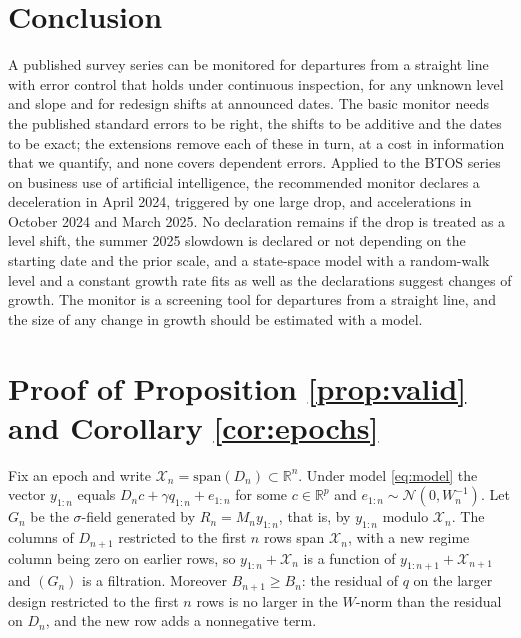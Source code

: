 \documentclass[Afour,sageh,times]{sagej}
\theoremstyle{definition}
\begin{document}
\section{Conclusion}
\label{sec:conclusion}

A published survey series can be monitored for departures from a straight line with error control that holds under continuous inspection, for any unknown level and slope and for redesign shifts at announced dates. The basic monitor needs the published standard errors to be right, the shifts to be additive and the dates to be exact; the extensions remove each of these in turn, at a cost in information that we quantify, and none covers dependent errors. Applied to the BTOS series on business use of artificial intelligence, the recommended monitor declares a deceleration in April 2024, triggered by one large drop, and accelerations in October 2024 and March 2025. No declaration remains if the drop is treated as a level shift, the summer 2025 slowdown is declared or not depending on the starting date and the prior scale, and a state-space model with a random-walk level and a constant growth rate fits as well as the declarations suggest changes of growth. The monitor is a screening tool for departures from a straight line, and the size of any change in growth should be estimated with a model.

\appendix

\section{Proof of Proposition \ref{prop:valid} and Corollary \ref{cor:epochs}}
\label{app:proof}

Fix an epoch and write $\mathcal{X}_n = \mathrm{span}(D_n) \subset \mathbb{R}^n$. Under model \eqref{eq:model} the vector $y_{1:n}$ equals $D_n c + \gamma q_{1:n} + e_{1:n}$ for some $c \in \mathbb{R}^p$ and $e_{1:n} \sim \mathcal{N}(0, W_n^{-1})$. Let $G_n$ be the $\sigma$-field generated by $R_n = M_n y_{1:n}$, that is, by $y_{1:n}$ modulo $\mathcal{X}_n$. The columns of $D_{n+1}$ restricted to the first $n$ rows span $\mathcal{X}_n$, with a new regime column being zero on earlier rows, so $y_{1:n} + \mathcal{X}_n$ is a function of $y_{1:n+1} + \mathcal{X}_{n+1}$ and $(G_n)$ is a filtration. Moreover $B_{n+1} \ge B_n$: the residual of $q$ on the larger design restricted to the first $n$ rows is no larger in the $W$-norm than the residual on $D_n$, and the new row adds a nonnegative term.
\end{document}
